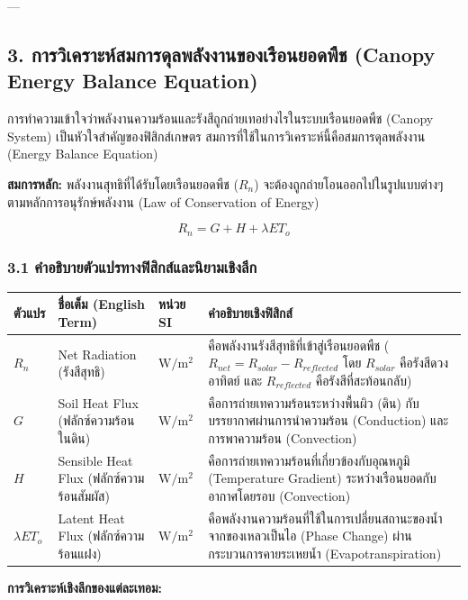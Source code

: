 \documentclass[11pt,a4paper,openany]{report}
\begin{document}
---

\subsection{3. การวิเคราะห์สมการดุลพลังงานของเรือนยอดพืช (Canopy Energy Balance Equation)}


การทำความเข้าใจว่าพลังงานความร้อนและรังสีถูกถ่ายเทอย่างไรในระบบเรือนยอดพืช (Canopy System) เป็นหัวใจสำคัญของฟิสิกส์เกษตร สมการที่ใช้ในการวิเคราะห์นี้คือสมการดุลพลังงาน (Energy Balance Equation)

\textbf{สมการหลัก:}
พลังงานสุทธิที่ได้รับโดยเรือนยอดพืช ($R_n$) จะต้องถูกถ่ายโอนออกไปในรูปแบบต่างๆ ตามหลักการอนุรักษ์พลังงาน (Law of Conservation of Energy)

$$R_n = G + H + \lambda ET_o$$


\subsubsection{3.1 คำอธิบายตัวแปรทางฟิสิกส์และนิยามเชิงลึก}


\begin{table}[htbp]
\centering
\begin{tabularx}{\textwidth}{L L L L}
\toprule
ตัวแปร & ชื่อเต็ม (English Term) & หน่วย SI & คำอธิบายเชิงฟิสิกส์ \\
\midrule
$R_n$ & Net Radiation (รังสีสุทธิ) & $\text{W}/\text{m}^2$ & คือพลังงานรังสีสุทธิที่เข้าสู่เรือนยอดพืช ($R_{net} = R_{solar} - R_{reflected}$ โดย $R_{solar}$ คือรังสีดวงอาทิตย์ และ $R_{reflected}$ คือรังสีที่สะท้อนกลับ) \\
$G$ & Soil Heat Flux (ฟลักซ์ความร้อนในดิน) & $\text{W}/\text{m}^2$ & คือการถ่ายเทความร้อนระหว่างพื้นผิว (ดิน) กับบรรยากาศผ่านการนำความร้อน (Conduction) และการพาความร้อน (Convection) \\
$H$ & Sensible Heat Flux (ฟลักซ์ความร้อนสัมผัส) & $\text{W}/\text{m}^2$ & คือการถ่ายเทความร้อนที่เกี่ยวข้องกับอุณหภูมิ (Temperature Gradient) ระหว่างเรือนยอดกับอากาศโดยรอบ (Convection) \\
$\lambda ET_o$ & Latent Heat Flux (ฟลักซ์ความร้อนแฝง) & $\text{W}/\text{m}^2$ & คือพลังงานความร้อนที่ใช้ในการเปลี่ยนสถานะของน้ำจากของเหลวเป็นไอ (Phase Change) ผ่านกระบวนการคายระเหยน้ำ (Evapotranspiration) \\
\bottomrule
\end{tabularx}
\end{table}


\textbf{การวิเคราะห์เชิงลึกของแต่ละเทอม:}
\end{document}

